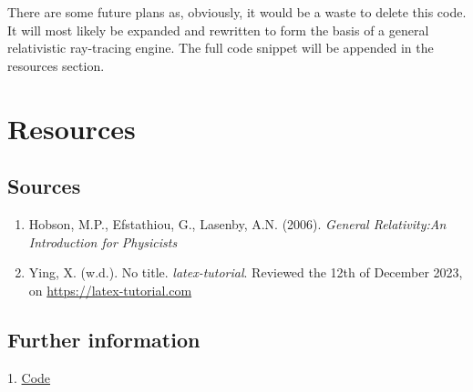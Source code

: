 \documentclass{article}
\begin{document}
There are some future plans as, obviously, it would be a waste to delete this code. It will most likely be expanded and rewritten to form the basis of a general relativistic ray-tracing engine. The full code snippet will be appended in the resources section.

\newpage

\section{Resources}

\subsection{Sources}

\begin{enumerate}
  \item Hobson, M.P., Efstathiou, G., Lasenby, A.N. (2006). \textit{General Relativity:An Introduction for Physicists}
  \item Ying, X. (w.d.). No title. \textit{latex-tutorial}. Reviewed the 12th of December 2023, on \href{https://latex-tutorial.com}{https://latex-tutorial.com}
\end{enumerate}

\subsection{Further information}

1. \href{https://github.com/programmingyeah/GR-simulator}{Code}
\end{document}
